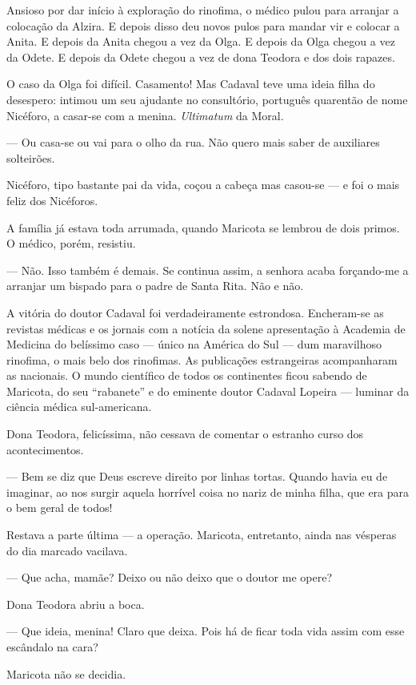 Ansioso por dar início à exploração do rinofima, o médico pulou para
arranjar a colocação da Alzira. E depois disso deu novos pulos para
mandar vir e colocar a Anita. E depois da Anita chegou a vez da Olga. E
depois da Olga chegou a vez da Odete. E depois da Odete chegou a vez de
dona Teodora e dos dois rapazes.

O caso da Olga foi difícil. Casamento! Mas Cadaval teve uma ideia filha
do desespero: intimou um seu ajudante no consultório, português
quarentão de nome Nicéforo, a casar-se com a menina. \emph{Ultimatum} da
Moral.

--- Ou casa-se ou vai para o olho da rua. Não quero mais saber de
auxiliares solteirões.

Nicéforo, tipo bastante pai da vida, coçou a cabeça mas casou-se --- e
foi o mais feliz dos Nicéforos.

A família já estava toda arrumada, quando Maricota se lembrou de dois
primos. O médico, porém, resistiu.

--- Não. Isso também é demais. Se continua assim, a senhora acaba
forçando-me a arranjar um bispado para o padre de Santa Rita. Não e não.

A vitória do doutor Cadaval foi verdadeiramente estrondosa. Encheram-se
as revistas médicas e os jornais com a notícia da solene apresentação à
Academia de Medicina do belíssimo caso --- único na América do Sul ---
dum maravilhoso rinofima, o mais belo dos rinofimas. As publicações
estrangeiras acompanharam as nacionais. O mundo científico de todos os
continentes ficou sabendo de Maricota, do seu ``rabanete'' e do eminente
doutor Cadaval Lopeira --- luminar da ciência médica sul-americana.

Dona Teodora, felicíssima, não cessava de comentar o estranho curso dos
acontecimentos.

--- Bem se diz que Deus escreve direito por linhas tortas. Quando havia
eu de imaginar, ao nos surgir aquela horrível coisa no nariz de minha
filha, que era para o bem geral de todos!

Restava a parte última --- a operação. Maricota, entretanto, ainda nas
vésperas do dia marcado vacilava.

--- Que acha, mamãe? Deixo ou não deixo que o doutor me opere?

Dona Teodora abriu a boca.

--- Que ideia, menina! Claro que deixa. Pois há de ficar toda vida assim
com esse escândalo na cara?

Maricota não se decidia.

